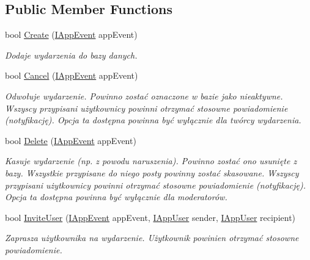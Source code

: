 \subsection*{Public Member Functions}
\begin{DoxyCompactItemize}
\item 
bool \hyperlink{class_bibabook_1_1_implementation_1_1_app_event_service_1_1_events_service_a3c3a0b4555e239f36e49615e3ca056cd}{Create} (\hyperlink{interface_contract_1_1_i_app_event}{I\+App\+Event} app\+Event)
\begin{DoxyCompactList}\small\item\em Dodaje wydarzenia do bazy danych. \end{DoxyCompactList}\item 
bool \hyperlink{class_bibabook_1_1_implementation_1_1_app_event_service_1_1_events_service_ae9d6dffe48aa929b26bac38dfb0c459a}{Cancel} (\hyperlink{interface_contract_1_1_i_app_event}{I\+App\+Event} app\+Event)
\begin{DoxyCompactList}\small\item\em Odwołuje wydarzenie. Powinno zostać oznaczone w bazie jako nieaktywne. Wszyscy przypisani użytkownicy powinni otrzymać stosowne powiadomienie (notyfikację). Opcja ta dostępna powinna być wyłącznie dla twórcy wydarzenia. \end{DoxyCompactList}\item 
bool \hyperlink{class_bibabook_1_1_implementation_1_1_app_event_service_1_1_events_service_a18493d649b2ea4c86428968f62eebcf5}{Delete} (\hyperlink{interface_contract_1_1_i_app_event}{I\+App\+Event} app\+Event)
\begin{DoxyCompactList}\small\item\em Kasuje wydarzenie (np. z powodu naruszenia). Powinno zostać ono usunięte z bazy. Wszystkie przypisane do niego posty powinny zostać skasowane. Wszyscy przypisani użytkownicy powinni otrzymać stosowne powiadomienie (notyfikację). Opcja ta dostępna powinna być wyłącznie dla moderatorów. \end{DoxyCompactList}\item 
bool \hyperlink{class_bibabook_1_1_implementation_1_1_app_event_service_1_1_events_service_a03db2f4f2c7892f9a721c8fd58b86f45}{Invite\+User} (\hyperlink{interface_contract_1_1_i_app_event}{I\+App\+Event} app\+Event, \hyperlink{interface_contract_1_1_i_app_user}{I\+App\+User} sender, \hyperlink{interface_contract_1_1_i_app_user}{I\+App\+User} recipient)
\begin{DoxyCompactList}\small\item\em Zaprasza użytkownika na wydarzenie. Użytkownik powinien otrzymać stosowne powiadomienie. \end{DoxyCompactList}\item 

\end{DoxyCompactItemize}
